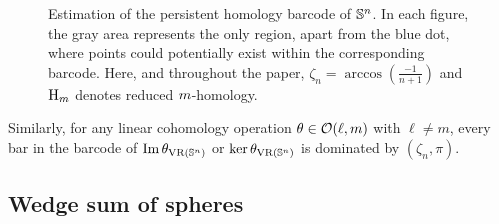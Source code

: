 \begin{figure}[ht]
	\centering
	
	\caption{Estimation of the persistent homology barcode of $\mathbb{S}^n$.
		In each figure, the gray area represents the only region, apart from the blue dot, where points could potentially exist within the corresponding barcode.
		Here, and throughout the paper, $\zeta_n = \arccos(\tfrac{-1}{n+1})$ and $\mathrm{H}_m $ denotes reduced $m$-homology. 
        }
	\label{fig:Sk}
\end{figure}

Similarly, for any linear cohomology operation $\theta \in \mathcal{O}(\ell,m)$ with $\ell \neq m$, every bar in the barcode of $\operatorname{Im}\theta_{\operatorname{VR}(\mathbb{S}^n)}$ or $\ker\theta_{\operatorname{VR}(\mathbb{S}^n)}$ is dominated by $(\zeta_n,\pi)$.


\subsection{Wedge sum of spheres}




